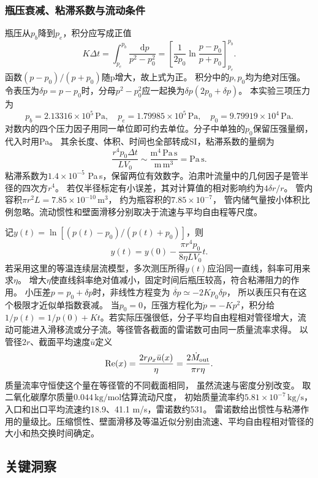 \documentclass[UTF8,fontset=fandol,a4paper,11pt]{ctexart}
\newcommand{\dd}{\mathop{}\!\mathrm{d}}
\begin{document}
\subsubsection*{瓶压衰减、粘滞系数与流动条件}
瓶压从$p_b$降到$p_e$，积分应写成正值
\[
K\Delta t=\int_{p_e}^{p_b}\frac{\dd p}{p^2-p_0^2}
=\left[\frac1{2p_0}\ln\frac{p-p_0}{p+p_0}\right]_{p_e}^{p_b}.
\]
函数$(p-p_0)/(p+p_0)$随p增大，故上式为正。
积分中的$p,p_0$均为绝对压强。令表压为$\delta p=p-p_0$时，分母$p^2-p_0^2$应一起换为$\delta p(2p_0+\delta p)$。
本实验三项压力为
\[
p_b=2.13316\times10^5\,\mathrm{Pa},\quad
p_e=1.79985\times10^5\,\mathrm{Pa},\quad
p_0=9.79919\times10^4\,\mathrm{Pa}.
\]
对数内的四个压力因子用同一单位即可约去单位。分子中单独的$p_0$保留压强量纲，代入时用Pa。
其余长度、体积、时间也全部转成SI，粘滞系数的量纲为
\[
\frac{r^4p_0\Delta t}{LV_0}
\sim\frac{\mathrm{m^4\,Pa\,s}}{\mathrm{m\,m^3}}
=\mathrm{Pa\,s}.
\]
粘滞系数为$1.4\times10^{-5}$ Pa\,s，保留两位有效数字。泊肃叶流量中的几何因子是管半径的四次方$r^4$。
若仅半径标定有小误差，其对计算值的相对影响约为$4\delta r/r$。
管内容积$\pi r^2L=7.85\times10^{-10}\,\mathrm{m^3}$，
约为瓶容积的$7.85\times10^{-7}$，
管内储气量按小体积比例忽略。流动惯性和壁面滑移分别取决于流速与平均自由程等尺度。

记$y(t)=\ln[(p(t)-p_0)/(p(t)+p_0)]$，则
\[
y(t)=y(0)-\frac{\pi r^4p_0}{8\eta LV_0}t.
\]
若采用这里的等温连续层流模型，多次测压所得$y(t)$应沿同一直线，斜率可用来求$\eta$。
增大$\eta$使直线斜率绝对值减小，固定时间后瓶压较高，符合粘滞阻力的作用。
小压差$p=p_0+\delta p$时，非线性方程变为
$\dot{\delta p}\simeq-2Kp_0\delta p$，
所以表压只有在这个极限才近似单指数衰减。
当$p_0=0$，压强方程化为$\dot p=-Kp^2$，积分给$1/p(t)=1/p(0)+Kt$。若实际压强很低，分子平均自由程相对管径增大，流动可能进入滑移流或分子流。等径管各截面的雷诺数可由同一质量流率求得。
以管径$2r$、截面平均速度$\bar u$定义
\[
\mathrm{Re}(x)=\frac{2r\rho_x\bar u(x)}\eta
=\frac{2\dot M_{\rm out}}{\pi r\eta}.
\]
质量流率守恒使这个量在等径管的不同截面相同，
虽然流速与密度分别改变。
取二氧化碳摩尔质量$0.044\,\mathrm{kg/mol}$估算流动尺度，
初始质量流率约$5.81\times10^{-7}\,\mathrm{kg/s}$，
入口和出口平均流速约18.9、41.1 m/s，雷诺数约531。
雷诺数给出惯性与粘滞作用的量级比。压缩惯性、壁面滑移及等温近似分别由流速、平均自由程相对管径的大小和热交换时间确定。





\subsection*{关键洞察}
\end{document}
